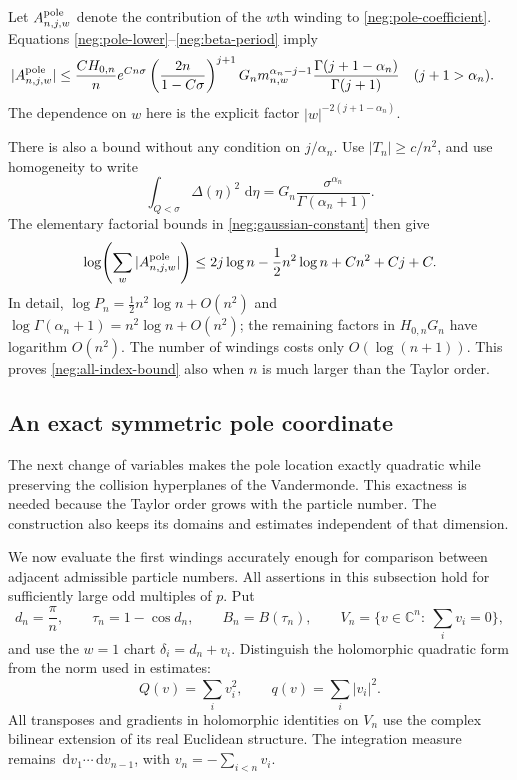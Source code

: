 \documentclass[11pt]{article}
\numberwithin{equation}{section}
\theoremstyle{definition}
\newcommand{\C}{\mathbb C}
\newcommand{\dd}{\,\mathrm d}
\begin{document}
Let \(A^{\rm pole}_{n,j,w}\) denote the contribution of the \(w\)th
winding to \eqref{neg:pole-coefficient}.  Equations
\eqref{neg:pole-lower}--\eqref{neg:beta-period} imply
\begin{align}
 |A^{\rm pole}_{n,j,w}|
 &\le \frac{CH_{0,n}}n e^{Cn\sigma}
    \left(\frac{2n}{1-C\sigma}\right)^{j+1}
    G_n m_{n,w}^{\alpha_n-j-1}
    \frac{\Gamma(j+1-\alpha_n)}{\Gamma(j+1)}
 \quad(j+1>\alpha_n).
 \label{neg:winding-bound}
\end{align}
The dependence on \(w\) here is the explicit factor
\(|w|^{-2(j+1-\alpha_n)}\).

There is also a bound without any condition on \(j/\alpha_n\).
Use \(|T_n|\ge c/n^2\), and use homogeneity to write
\[
 \int_{Q<\sigma}\Delta(\eta)^2\,\dd\eta
       =G_n\frac{\sigma^{\alpha_n}}{\Gamma(\alpha_n+1)}.
 \]
The elementary factorial bounds in \eqref{neg:gaussian-constant}
then give
\begin{equation}
 \log\!\left(\sum_w|A^{\rm pole}_{n,j,w}|\right)
 \le 2j\log n-\frac12n^2\log n+Cn^2+Cj+C .
 \label{neg:all-index-bound}
\end{equation}
In detail,
\(\log P_n=\tfrac12n^2\log n+O(n^2)\) and
\(\log\Gamma(\alpha_n+1)=n^2\log n+O(n^2)\);
the remaining factors in \(H_{0,n}G_n\) have logarithm \(O(n^2)\).
The number of windings costs only \(O(\log(n+1))\).
This proves \eqref{neg:all-index-bound} also when \(n\) is much
larger than the Taylor order.

\subsection{An exact symmetric pole coordinate}
\label{neg:normal-form}

The next change of variables makes the pole location exactly
quadratic while preserving the collision hyperplanes of the
Vandermonde. This exactness is needed because the Taylor order grows
with the particle number. The construction also keeps its domains
and estimates independent of that dimension.

We now evaluate the first windings accurately enough for comparison
between adjacent admissible particle numbers.  All assertions in
this subsection hold for sufficiently large odd multiples of \(p\).
Put
\begin{equation}
 d_n=\frac\pi n,\qquad
 \tau_n=1-\cos d_n,\qquad B_n=B(\tau_n),\qquad
 V_n=\{v\in\C^n:\ \sum_i v_i=0\},
 \label{neg:center}
\end{equation}
and use the \(w=1\) chart \(\delta_i=d_n+v_i\).  Distinguish the
holomorphic quadratic form from the norm used in estimates:
\[
 Q(v)=\sum_i v_i^2,\qquad q(v)=\sum_i|v_i|^2 .
 \]
All transposes and gradients in holomorphic identities on \(V_n\)
use the complex bilinear extension of its real Euclidean structure.
The integration measure remains
\(\dd v_1\cdots\dd v_{n-1}\), with \(v_n=-\sum_{i<n}v_i\).
\end{document}
